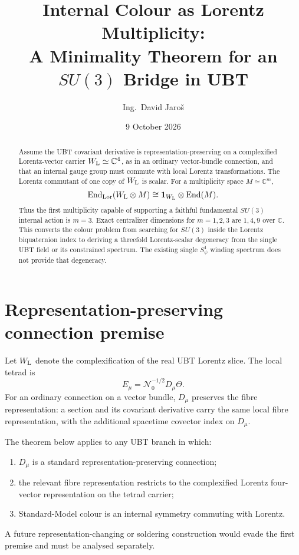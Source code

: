 \documentclass[11pt,a4paper]{article}
\title{Internal Colour as Lorentz Multiplicity:\\
A Minimality Theorem for an $SU(3)$ Bridge in UBT}
\author{Ing.\ David Jaro\v{s}}
\date{9 October 2026}
\begin{document}
\maketitle

\begin{abstract}
Assume the UBT covariant derivative is representation-preserving on a
complexified Lorentz-vector carrier $W_{\rm L}\simeq\mathbb C^4$, as in an
ordinary vector-bundle connection, and that an internal gauge group must
commute with local Lorentz transformations. The Lorentz commutant of one copy
of $W_{\rm L}$ is scalar. For a multiplicity space $M\simeq\mathbb C^m$,
\[
 \operatorname{End}_{\rm Lor}(W_{\rm L}\otimes M)
 \cong \mathbf1_{W_{\rm L}}\otimes\operatorname{End}(M).
\]
Thus the first multiplicity capable of supporting a faithful fundamental
$SU(3)$ internal action is $m=3$. Exact centralizer dimensions for $m=1,2,3$
are $1,4,9$ over $\mathbb C$. This converts the colour problem from searching
for $SU(3)$ inside the Lorentz biquaternion index to deriving a threefold
Lorentz-scalar degeneracy from the single UBT field or its constrained
spectrum. The existing single $S^1_\psi$ winding spectrum does not provide
that degeneracy.
\end{abstract}

\section{Representation-preserving connection premise}

Let $W_{\rm L}$ denote the complexification of the real UBT Lorentz slice.
The local tetrad is
\[
 E_\mu=\mathcal N_0^{-1/2}D_\mu\Theta.
\]
For an ordinary connection on a vector bundle, $D_\mu$ preserves the fibre
representation: a section and its covariant derivative carry the same local
fibre representation, with the additional spacetime covector index on
$D_\mu$.

The theorem below applies to any UBT branch in which:
\begin{enumerate}
 \item $D_\mu$ is a standard representation-preserving connection;
 \item the relevant fibre representation restricts to the complexified
       Lorentz four-vector representation on the tetrad carrier;
 \item Standard-Model colour is an internal symmetry commuting with Lorentz.
\end{enumerate}
A future representation-changing or soldering construction would evade the
first premise and must be analysed separately.
\end{document}

